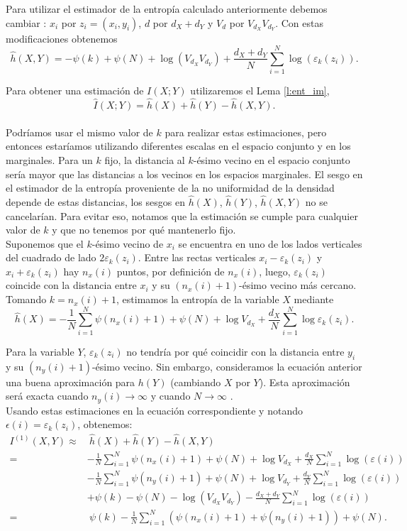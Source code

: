 \documentclass[12pt,a4paper]{report} %
\theoremstyle{definition}
\begin{document}
Para utilizar el estimador de la entropía calculado anteriormente debemos cambiar\!\! : $x_i$ por $z_i=(x_i,y_i)$, $d$ por $d_X + d_Y$ y $V_d$ por $V_{d_X}V_{d_Y}$. Con estas modificaciones obtenemos\[
\widehat{h}(X,Y) = - \psi(k) + \psi(N) + \log (V_{d_X}V_{d_Y}) + \frac{d_X+d_Y}{N} \sum_{i=1}^N\log\left(\varepsilon_k(z_i)\right).
\]

Para obtener una estimación de $I(X;Y)$ utilizaremos el Lema \ref{l:ent_im},\[
\hat{I}(X;Y) = \hat{h}(X) + \hat{h}(Y) - \hat{h}(X,Y).
\]\\[-15pt]

Podríamos usar el mismo valor de $k$ para realizar estas estimaciones, pero entonces estaríamos utilizando diferentes escalas en el espacio conjunto y en los marginales. Para un $k$ fijo, la distancia al $k$-ésimo vecino en el espacio conjunto sería mayor que las distancias a los vecinos en los espacios marginales. El sesgo en el estimador de la entropía proveniente de la no uniformidad de la densidad depende de estas distancias, los sesgos en $\widehat{h}(X)$, $\widehat{h}(Y)$, $\widehat{h}(X,Y)$ no se cancelarían. Para evitar eso, notamos que la estimación se cumple para cualquier valor de $k$ y que no tenemos por qué mantenerlo fijo.\\

Suponemos que el $k$-ésimo vecino de $x_i$ se encuentra en uno de los lados verticales del cuadrado de lado $2\varepsilon_k(z_i)$. Entre las rectas verticales $x_i - \varepsilon_k(z_i)$ y $x_i + \varepsilon_k(z_i)$ hay $n_x(i)$ puntos, por definición de $n_x(i)$, luego, $\varepsilon_k(z_i)$ coincide con la distancia entre $x_i$ y su $(n_x(i) + 1)$-ésimo vecino más cercano. Tomando $k = n_x(i)+1$, estimamos la entropía de la variable $X$ mediante\[
\widehat{h}(X) = - \frac{1}{N}\sum_{i=1}^N\psi(n_x(i)+1) + \psi(N) + \log V_{d_X} + \frac{d_X}{N} \sum_{i=1}^N\log \varepsilon_k(z_i).
\]

Para la variable $Y$, $\varepsilon_k(z_i)$ no tendría por qué coincidir con la distancia entre $y_i$ y su $(n_y(i)+1)$-ésimo vecino. Sin embargo, consideramos la ecuación anterior una buena aproximación para $h(Y)$ (cambiando $X$ por $Y$). Esta aproximación será exacta cuando $n_y(i) \to \infty$ y cuando $N\to \infty$ \cite{singh_finite-sample_2016}.\\ 

Usando estas estimaciones en la ecuación correspondiente y notando $\epsilon(i) = \varepsilon_k(z_i)$, obtenemos:
\begin{align*}
  I^{(1)}(X,Y) \approx& \ \widehat{h}(X) + \widehat{h}(Y) - \widehat{h}(X, Y)\\ =& - \frac{1}{N}\sum_{i=1}^N\psi(n_x(i)+1) + \psi(N) + \log V_{d_X} + \frac{d_X}{N} \sum_{i=1}^N\log (\varepsilon(i))\\
  & - \frac{1}{N}\sum_{i=1}^N\psi(n_y(i)+1) + \psi(N) + \log V_{d_Y} + \frac{d_Y}{N} \sum_{i=1}^N\log (\varepsilon(i))\\
  & + \psi(k) - \psi(N) - \log (V_{d_X}V_{d_Y}) - \frac{d_X+d_Y}{N} \sum_{i=1}^N\log(\varepsilon(i))\\
  =& \ \psi(k) - \frac{1}{N}\sum_{i=1}^N\left( \psi(n_x(i)+1) + \psi(n_y(i)+1) \right ) + \psi(N).\\[-5pt]
\end{align*}
\end{document}
